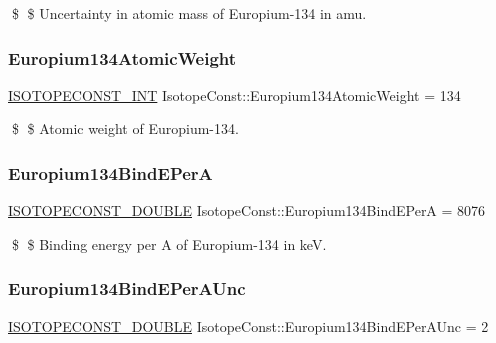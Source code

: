 \$ \$ Uncertainty in atomic mass of Europium-\/134 in amu. \mbox{\label{group___isotope_const-_europium-_eu134_gaacde92abf277257a920f62de2092bbb3}} 
\subsubsection{\texorpdfstring{Europium134\+Atomic\+Weight}{Europium134AtomicWeight}}
{\footnotesize\ttfamily \mbox{\hyperlink{group___isotope_const-_macros_ga5f18360b3e99483a35c32d789e62621c}{I\+S\+O\+T\+O\+P\+E\+C\+O\+N\+S\+T\+\_\+\+I\+NT}} Isotope\+Const\+::\+Europium134\+Atomic\+Weight = 134}

\$ \$ Atomic weight of Europium-\/134. \mbox{\label{group___isotope_const-_europium-_eu134_gad2357ab893eaaf868cfdb291c708c752}} 
\subsubsection{\texorpdfstring{Europium134\+Bind\+E\+PerA}{Europium134BindEPerA}}
{\footnotesize\ttfamily \mbox{\hyperlink{group___isotope_const-_macros_ga8f45a7272ce02c0b4c65c44636ed719a}{I\+S\+O\+T\+O\+P\+E\+C\+O\+N\+S\+T\+\_\+\+D\+O\+U\+B\+LE}} Isotope\+Const\+::\+Europium134\+Bind\+E\+PerA = 8076}

\$ \$ Binding energy per A of Europium-\/134 in keV. \mbox{\label{group___isotope_const-_europium-_eu134_ga9d15314f549570cec8493e7e9793f86e}} 
\subsubsection{\texorpdfstring{Europium134\+Bind\+E\+Per\+A\+Unc}{Europium134BindEPerAUnc}}
{\footnotesize\ttfamily \mbox{\hyperlink{group___isotope_const-_macros_ga8f45a7272ce02c0b4c65c44636ed719a}{I\+S\+O\+T\+O\+P\+E\+C\+O\+N\+S\+T\+\_\+\+D\+O\+U\+B\+LE}} Isotope\+Const\+::\+Europium134\+Bind\+E\+Per\+A\+Unc = 2}

